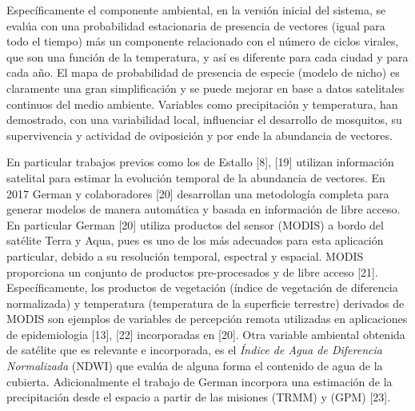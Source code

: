Específicamente el componente ambiental, en la versión inicial del sistema, se
evalúa con una probabilidad estacionaria de presencia de vectores (igual para
todo el tiempo) más un componente relacionado con el número de ciclos virales,
que son una función de la temperatura, y así es diferente para cada ciudad y
para cada año. El mapa de probabilidad de presencia de especie (modelo de nicho)
es claramente una gran simplificación y se puede mejorar en base a datos
satelitales continuos del medio ambiente. Variables como precipitación y
temperatura, han demostrado, con una variabilidad local, influenciar el
desarrollo de mosquitos, su supervivencia y actividad de oviposición y por ende
la abundancia de vectores.

En particular trabajos previos como los de Estallo [8], [19] utilizan información
satelital para estimar la evolución temporal de la abundancia de vectores.
En 2017 German y colaboradores [20] desarrollan una metodología completa
para generar modelos de manera automática y basada en información de libre
acceso. En particular German [20] utiliza productos del sensor (MODIS) a bordo
del satélite Terra y Aqua, pues es uno de los más adecuados para esta
aplicación particular, debido a su resolución temporal, espectral y espacial.
MODIS proporciona un conjunto de productos pre-procesados y de libre acceso [21].
Específicamente, los productos de vegetación (índice de vegetación de diferencia
normalizada) y temperatura (temperatura de la superficie terrestre) derivados
de MODIS son ejemplos de variables de percepción remota utilizadas
en aplicaciones de epidemiologia [13], [22] incorporadas en [20]. Otra variable
ambiental obtenida de satélite que es relevante e incorporada, es el
\textit{Índice de Agua de Diferencia Normalizada} (NDWI) que evalúa de alguna
forma el contenido de agua de la cubierta. Adicionalmente el trabajo de German
incorpora una estimación de la precipitación desde el espacio a partir de las
misiones (TRMM) y (GPM) [23].


